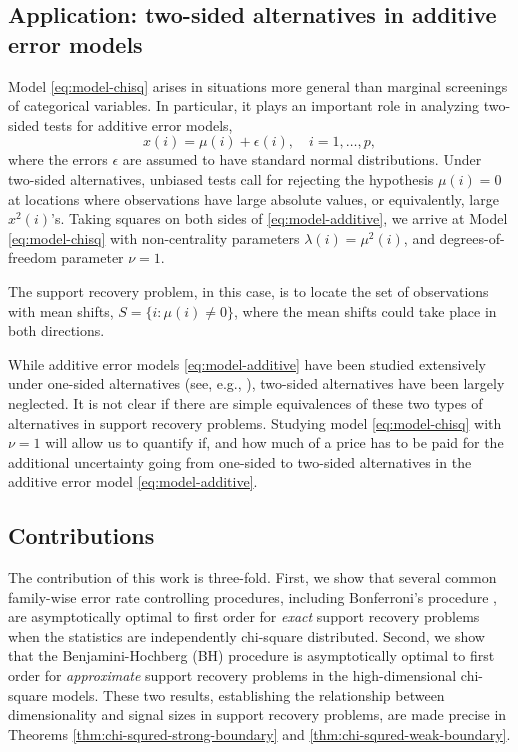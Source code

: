 \subsection{Application: two-sided alternatives in additive error models}

Model \eqref{eq:model-chisq} arises in situations more general than marginal screenings of categorical variables.
In particular, it plays an important role in analyzing two-sided tests for additive error models,
\begin{equation} \label{eq:model-additive}
    x(i) = \mu(i) + \epsilon(i), \quad i=1,\ldots,p,
\end{equation}
where the errors $\epsilon$ are assumed to have standard normal distributions.
Under two-sided alternatives, unbiased tests call for rejecting the hypothesis $\mu(i)=0$ at locations where observations have large absolute values, or equivalently, large $x^2(i)$'s.
Taking squares on both sides of \eqref{eq:model-additive}, we arrive at Model \eqref{eq:model-chisq} with non-centrality parameters $\lambda(i) = \mu^2(i)$, and degrees-of-freedom parameter $\nu =1$.

The support recovery problem, in this case, is to locate the set of observations with mean shifts, $S=\{i:\mu(i)\neq 0\}$, where the mean shifts could take place in both directions.

While additive error models \eqref{eq:model-additive} have been studied extensively under one-sided alternatives (see, e.g., \cite{arias2017distribution, butucea2018variable, gao2018fundamental}), two-sided alternatives have been largely neglected.
It is not clear if there are simple equivalences of these two types of alternatives in support recovery problems.
Studying model \eqref{eq:model-chisq} with $\nu =1 $ will allow us to quantify if, and how much of a price has to be paid for the additional uncertainty going from one-sided to two-sided alternatives in the additive error model \eqref{eq:model-additive}.

\subsection{Contributions}

The contribution of this work is three-fold.
First, we show that several common family-wise error rate controlling procedures, including Bonferroni's procedure \cite{dunn1961multiple}, are asymptotically optimal to first order for \emph{exact} support recovery problems when the statistics are independently chi-square distributed.
Second, we show that the Benjamini-Hochberg (BH) procedure \cite{benjamini1995controlling} is asymptotically optimal to first order for \emph{approximate} support recovery problems in the high-dimensional chi-square models.
These two results, establishing the relationship between dimensionality and signal sizes in support recovery problems, are made precise in Theorems \ref{thm:chi-squred-strong-boundary} and \ref{thm:chi-squred-weak-boundary}.

